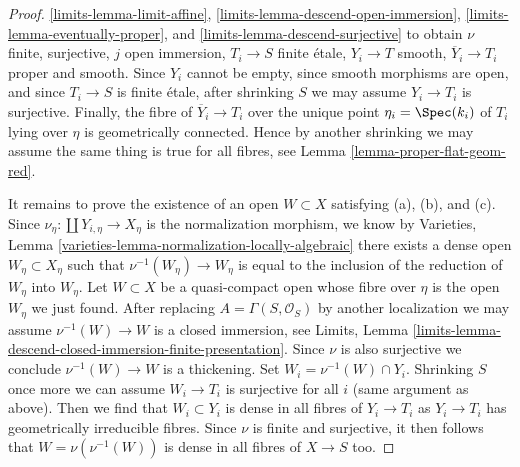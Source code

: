 \begin{proof}
\ref{limits-lemma-limit-affine},
\ref{limits-lemma-descend-open-immersion},
\ref{limits-lemma-eventually-proper}, and
\ref{limits-lemma-descend-surjective}
to obtain $\nu$ finite, surjective, $j$ open immersion, $T_i \to S$ finite
\'etale, $Y_i \to T$ smooth, $\overline{Y}_i \to T_i$ proper and
smooth. Since $Y_i$ cannot be empty, since smooth morphisms
are open, and since $T_i \to S$ is finite \'etale, after shrinking $S$
we may assume $Y_i \to T_i$ is surjective. Finally, the fibre of
$\overline{Y}_i \to T_i$ over the unique point $\eta_i = \Spec(k_i)$ 
of $T_i$ lying over $\eta$ is geometrically connected.
Hence by another shrinking we may assume the same thing is
true for all fibres, see
Lemma \ref{lemma-proper-flat-geom-red}.

\medskip\noindent
It remains to prove the existence of an open $W \subset X$
satisfying (a), (b), and (c). Since $\nu_\eta : \coprod Y_{i, \eta} \to X_\eta$
is the normalization morphism, we know by
Varieties, Lemma \ref{varieties-lemma-normalization-locally-algebraic}
there exists a dense open $W_\eta \subset X_\eta$
such that $\nu^{-1}(W_\eta) \to W_\eta$ is equal to
the inclusion of the reduction of $W_\eta$ into $W_\eta$.
Let $W \subset X$ be a quasi-compact open whose fibre
over $\eta$ is the open $W_\eta$ we just found.
After replacing $A = \Gamma(S, \mathcal{O}_S)$
by another localization we may assume $\nu^{-1}(W) \to W$
is a closed immersion, see Limits, Lemma
\ref{limits-lemma-descend-closed-immersion-finite-presentation}.
Since $\nu$ is also surjective we conclude
$\nu^{-1}(W) \to W$ is a thickening.
Set $W_i = \nu^{-1}(W) \cap Y_i$.
Shrinking $S$ once more we can assume $W_i \to T_i$ is
surjective for all $i$ (same argument as above).
Then we find that $W_i \subset Y_i$
is dense in all fibres of $Y_i \to T_i$ as $Y_i \to T_i$ has
geometrically irreducible fibres.
Since $\nu$ is finite and surjective, it then follows
that $W = \nu(\nu^{-1}(W))$ is dense in all fibres
of $X \to S$ too.
\end{proof}
